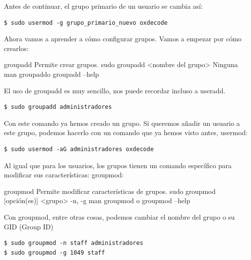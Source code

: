 Antes de continuar, el grupo primario de un usuario se cambia así:

\begin{tcolorbox-code}
\begin{lstlisting}
$ sudo usermod -g grupo_primario_nuevo oxdecode
\end{lstlisting}
\end{tcolorbox-code}

Ahora vamos a aprender a cómo configurar grupos. Vamos a empezar por cómo crearlos:

\begin{command-info}
{groupadd}
{Permite crear grupos.}
{sudo groupadd <nombre del grupo>}
{Ninguna}
{man groupaddo groupadd --help}
\end{command-info}

El uso de groupadd es muy sencillo, nos puede recordar incluso a useradd.

\begin{tcolorbox-code}
\begin{lstlisting}
$ sudo groupadd administradores
\end{lstlisting}
\end{tcolorbox-code}

Con este comando ya hemos creado un grupo. Si queremos añadir un usuario a este grupo, podemos hacerlo con un comando que ya hemos visto antes, usermod:

\begin{tcolorbox-code}
\begin{lstlisting}
$ sudo usermod -aG administradores oxdecode
\end{lstlisting}
\end{tcolorbox-code}

Al igual que para los usuarios, los grupos tienen un comando específico para modificar sus características: groupmod:

\begin{command-info}
{groupmod}
{Permite modificar características de grupos.}
{sudo groupmod [opción(es)] <grupo>}
{-n, -g}
{man groupmod o groupmod --help}
\end{command-info}

Con groupmod, entre otras cosas, podemos cambiar el nombre del grupo o su GID (Group ID)

\begin{tcolorbox-code}
\begin{lstlisting}
$ sudo groupmod -n staff administradores
$ sudo groupmod -g 1049 staff
\end{lstlisting}
\end{tcolorbox-code}

